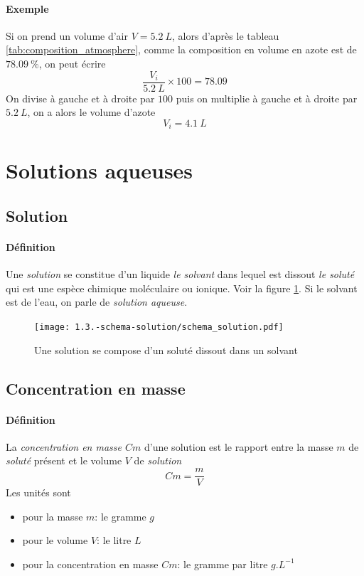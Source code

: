 \paragraph{Exemple} Si on prend un volume d'air $V=5.2~L$, alors
d'après le tableau \ref{tab:composition_atmosphere}, comme la 
composition en volume en azote est de $78.09~\%$, on peut écrire
$$ \frac{V_i}{5.2~L}\times 100 = 78.09$$ On divise à gauche et à droite 
par $100$ puis on multiplie à gauche et à droite par $5.2~L$, on
a alors le volume d'azote $$V_i = 4.1~L$$


\section{Solutions aqueuses}
\subsection{Solution}
\paragraph{Définition} Une \textit{solution} se constitue d'un liquide
\textit{le solvant} dans lequel est dissout \textit{le soluté} qui est
une espèce chimique moléculaire ou ionique. Voir la figure \ref{fig:solution}. Si le solvant est de l'eau,
on parle de \textit{solution aqueuse}.
\begin{figure}[h!]
  \begin{center}
      \texttt{[image: 1.3.-schema-solution/schema\_solution.pdf]}
  \end{center}
  \caption{Une solution se compose d'un soluté dissout dans un solvant}
  \label{fig:solution}
\end{figure}


\subsection{Concentration en masse}
\paragraph{Définition} La \textit{concentration en masse $Cm$} d'une solution
est le rapport entre la masse $m$ de \textit{soluté} présent et le volume
$V$ de \textit{solution} $$Cm = \frac{m}{V}$$
Les unités sont
\begin{itemize}
 \item pour la masse $m$: le gramme $g$
 \item pour le volume $V$: le litre $L$
 \item pour la concentration en masse $Cm$: le gramme par litre $g.L^{-1}$
\end{itemize}

